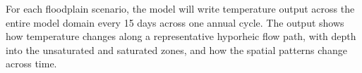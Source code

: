 \documentclass[a4paper]{article}
\begin{document}
For each floodplain scenario, the model will write temperature output across the entire model domain every 15 days across one annual cycle. The output shows how temperature changes along a representative hyporheic flow path, with depth into the unsaturated and saturated zones, and how the spatial patterns change across time. 






\end{document}
